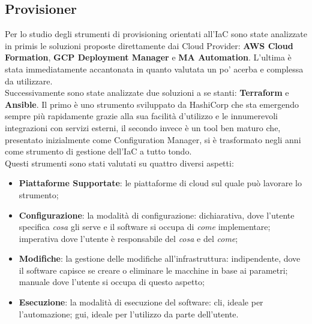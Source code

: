 \subsection{Provisioner}
Per lo studio degli strumenti di provisioning orientati all'IaC sono state analizzate in primis le soluzioni proposte direttamente dai Cloud Provider: \textbf{AWS Cloud Formation}, \textbf{GCP Deployment Manager} e \textbf{MA Automation}. L'ultima è stata immediatamente accantonata in quanto valutata un po' acerba e complessa da utilizzare. \\
Successivamente sono state analizzate due soluzioni a se stanti: \textbf{Terraform} e \textbf{Ansible}. Il primo è uno strumento sviluppato da HashiCorp che sta emergendo sempre più rapidamente grazie alla sua facilità d'utilizzo e le innumerevoli integrazioni con servizi esterni, il secondo invece è un tool ben maturo che, presentato inizialmente come Configuration Manager, si è trasformato negli anni come strumento di gestione dell'IaC a tutto tondo.\\
Questi strumenti sono stati valutati su quattro diversi aspetti:
\begin{itemize}
	\item \textbf{Piattaforme Supportate}: le piattaforme di cloud sul quale può lavorare lo strumento;
	\item \textbf{Configurazione}: la modalità di configurazione: dichiarativa, dove l'utente specifica \textit{cosa} gli serve e il software si occupa di \textit{come} implementare; imperativa dove l'utente è responsabile del \textit{cosa} e del \textit{come};
	\item \textbf{Modifiche}: la gestione delle modifiche all'infrastruttura: indipendente, dove il software capisce se creare o eliminare le macchine in base ai parametri; manuale dove l'utente si occupa di questo aspetto;
	\item \textbf{Esecuzione}: la modalità di esecuzione del software: \gls{cli}, ideale per l'automazione; \gls{gui}, ideale per l'utilizzo da parte dell'utente.
\end{itemize}

